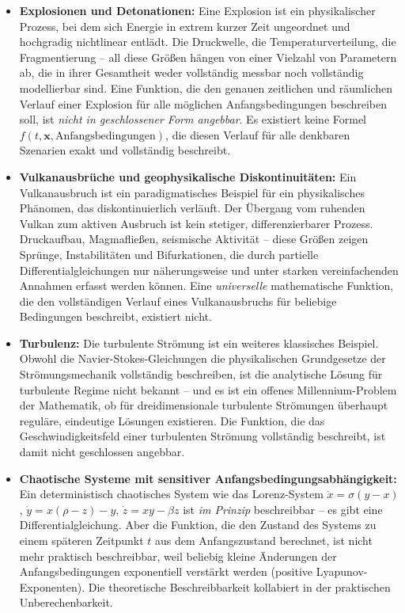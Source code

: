 ﻿\documentclass[12pt, a4paper]{article}
\begin{document}
	\begin{itemize}
		\item \textbf{Explosionen und Detonationen:} Eine Explosion ist ein physikalischer Prozess, bei dem sich Energie in extrem kurzer Zeit ungeordnet und hochgradig nichtlinear entlädt. Die Druckwelle, die Temperaturverteilung, die Fragmentierung -- all diese Größen hängen von einer Vielzahl von Parametern ab, die in ihrer Gesamtheit weder vollständig messbar noch vollständig modellierbar sind. Eine Funktion, die den genauen zeitlichen und räumlichen Verlauf einer Explosion für alle möglichen Anfangsbedingungen beschreiben soll, ist \textit{nicht in geschlossener Form angebbar}. Es existiert keine Formel $f(t, \mathbf{x}, \text{Anfangsbedingungen})$, die diesen Verlauf für alle denkbaren Szenarien exakt und vollständig beschreibt.
		\item \textbf{Vulkanausbrüche und geophysikalische Diskontinuitäten:} Ein Vulkanausbruch ist ein paradigmatisches Beispiel für ein physikalisches Phänomen, das diskontinuierlich verläuft. Der Übergang vom ruhenden Vulkan zum aktiven Ausbruch ist kein stetiger, differenzierbarer Prozess. Druckaufbau, Magmafließen, seismische Aktivität -- diese Größen zeigen Sprünge, Instabilitäten und Bifurkationen, die durch partielle Differentialgleichungen nur näherungsweise und unter starken vereinfachenden Annahmen erfasst werden können. Eine \textit{universelle} mathematische Funktion, die den vollständigen Verlauf eines Vulkanausbruchs für beliebige Bedingungen beschreibt, existiert nicht.
		\item \textbf{Turbulenz:} Die turbulente Strömung ist ein weiteres klassisches Beispiel. Obwohl die Navier-Stokes-Gleichungen die physikalischen Grundgesetze der Strömungsmechanik vollständig beschreiben, ist die analytische Lösung für turbulente Regime nicht bekannt -- und es ist ein offenes Millennium-Problem der Mathematik, ob für dreidimensionale turbulente Strömungen überhaupt reguläre, eindeutige Lösungen existieren. Die Funktion, die das Geschwindigkeitsfeld einer turbulenten Strömung vollständig beschreibt, ist damit nicht geschlossen angebbar.
		\item \textbf{Chaotische Systeme mit sensitiver Anfangsbedingungsabhängigkeit:} Ein deterministisch chaotisches System wie das Lorenz-System $\dot{x} = \sigma(y-x)$, $\dot{y} = x(\rho - z) - y$, $\dot{z} = xy - \beta z$ ist \textit{im Prinzip} beschreibbar -- es gibt eine Differentialgleichung. Aber die Funktion, die den Zustand des Systems zu einem späteren Zeitpunkt $t$ aus dem Anfangszustand berechnet, ist nicht mehr praktisch beschreibbar, weil beliebig kleine Änderungen der Anfangsbedingungen exponentiell verstärkt werden (positive Lyapunov-Exponenten). Die theoretische Beschreibbarkeit kollabiert in der praktischen Unberechenbarkeit.
	\end{itemize}
\end{document}
